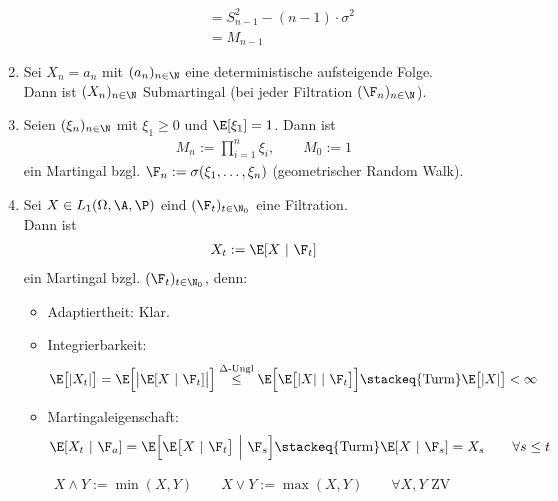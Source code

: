 \begin{beisp}
\begin{enumerate}[label=(\alph*)]
\begin{itemize}
\begin{align*}
&=S_{n-1}^2-(n-1)\cdot\sigma^2\\
&=M_{n-1}
\end{align*}
\end{itemize}
\item Sei $X_n=a_n$ mit $(a_n)_{n\in\N}$ eine deterministische aufsteigende Folge.\\
Dann ist $(X_n)_{n\in\N}$ Submartingal (bei jeder Filtration $(\F_n)_{n\in\N}$).
\item Seien $(\xi_n)_{n\in\N}$ mit $\xi_1\geq0$ und $\E[\xi_1]=1$. Dann ist
\begin{align*}
M_n:=\prod\limits_{i=1}^n\xi_i,\qquad M_0:=1
\end{align*}
ein Martingal bzgl. $\F_n:=\sigma(\xi_1,\ldots,\xi_n)$ (geometrischer Random Walk).
\item Sei $X\in L_1(\Omega,\A,\P)$ eind $(\F_t)_{t\in\N_0}$ eine Filtration.\\
Dann ist
\begin{align*}
X_t:=\E[X~|~\F_t]
\end{align*}
ein Martingal bzgl. $(\F_t)_{t\in\N_0}$, denn:
\begin{itemize}
\item Adaptiertheit: Klar.
\item Integrierbarkeit:
\begin{align*}
\E\big[|X_t|\big]
=\E\Big[\big|\E[X~|~\F_t]\big|\Big]
&\stackrel{\Delta\text{-Ungl}}{\leq}
\E\Big[\E\big[|X|~|~\F_t \big]\Big]
\stackeq{\text{Turm}}
\E\big[|X|\big]
<\infty
\end{align*}
\item Martingaleigenschaft:
\begin{align*}
\E[X_t~|~\F_a]
=\E\Big[\E\big[X~|~\F_t\big]~\Big|~ \F_s\Big]
\stackeq{\text{Turm}}
\E[X~|~\F_s]
=X_s
\qquad\forall s\leq t
\end{align*}
\end{itemize}
\end{enumerate}
\end{beisp}

\begin{notation}
\begin{align*}
X\wedge Y:=\min(X,Y)\qquad X\vee Y:=\max(X,Y)\qquad\forall X,Y\text{ ZV}
\end{align*}
\end{notation}

